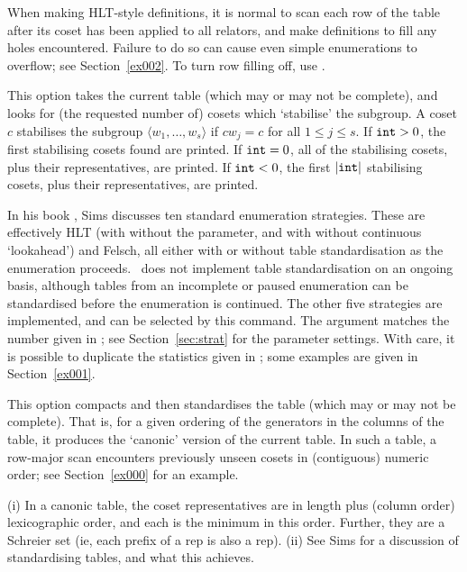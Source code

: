 \quad{}

When making HLT-style definitions, it is normal to scan each row of the
  table after its coset has been applied to all relators, and make 
  definitions to fill any holes encountered.
Failure to do so can cause even simple enumerations to overflow; see
  Section~\ref{ex002}.
To turn row filling off, use .
  
\quad{}

This option takes the current table (which may or may not be complete),
  and looks for (the requested number of) cosets which `stabilise' the
  subgroup.
A coset $c$ stabilises the subgroup $\langle w_1, \dots, w_s \rangle$ if 
  $c w_j = c$ for all $1 \le j \le s$.
%
If $\texttt{int} > 0$, the first  stabilising cosets found are
  printed.
If $\texttt{int} = 0$, all of the stabilising cosets, plus their
  representatives, are printed.
If $\texttt{int} < 0$, the first $|\texttt{int}|$ stabilising cosets,
  plus their representatives, are printed.

\quad{}

In his book \cite{Sim}, Sims discusses ten standard enumeration
  strategies.
These are effectively HLT (with \amp without the  parameter,
  and with \amp without continuous `lookahead') and Felsch, all either with
  or without table standardisation as the enumeration proceeds.
\ace\ does not implement table standardisation on an ongoing basis, 
  although tables from an incomplete or paused enumeration can be 
  standardised before the enumeration is continued.
The other five strategies are implemented, and can be selected by this
  command.
The argument matches the number given in \cite[\S5.5]{Sim}; see
  Section~\ref{sec:strat} for the parameter settings.
With care, it is possible to duplicate the statistics given in \cite{Sim};
  some examples are given in Section~\ref{ex001}.

\quad{}

This option compacts and then standardises the table (which may or may
  not be complete).
That is, for a given ordering of the generators in the columns of the
  table, it produces the `canonic' version of the current table.
In such a table, a row-major scan encounters previously unseen cosets in
  (contiguous) numeric order; see Section~\ref{ex000} for an example.

(i)
In a canonic table, the coset representatives are in length plus (column
  order) lexicographic order, and each is the minimum in this order.
Further, they are a Schreier set (ie, each prefix of a rep is also a rep).
(ii)
See Sims \cite{Sim} for a discussion of standardising tables, and what
  this achieves.

